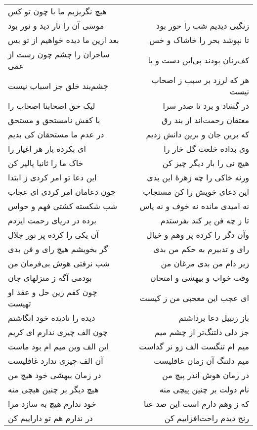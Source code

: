 \begin{center}
\begin{longtable}{l p{0.5cm} r}
هیچ نگریزیم ما با چون تو کس
\\
موسی آن را نار دید و نور بود
&&
زنگیی دیدیم شب را حور بود
\\
بعد ازین ما دیده خواهیم از تو بس
&&
تا نپوشد بحر را خاشاک و خس
\\
ساحران را چشم چون رست از عمی
&&
کف‌زنان بودند بی‌این دست و پا
\\
چشم‌بند خلق جز اسباب نیست
&&
هر که لرزد بر سبب ز اصحاب نیست
\\
لیک حق اصحابنا اصحاب را
&&
در گشاد و برد تا صدر سرا
\\
با کفش نامستحق و مستحق
&&
معتقان رحمت‌اند از بند رق
\\
در عدم ما مستحقان کی بدیم
&&
که برین جان و برین دانش زدیم
\\
ای بکرده یار هر اغیار را
&&
وی بداده خلعت گل خار را
\\
خاک ما را ثانیا پالیز کن
&&
هیچ نی را بار دیگر چیز کن
\\
این دعا تو امر کردی ز ابتدا
&&
ورنه خاکی را چه زهرهٔ این بدی
\\
چون دعامان امر کردی ای عجاب
&&
این دعای خویش را کن مستجاب
\\
شب شکسته کشتی فهم و حواس
&&
نه امیدی مانده نه خوف و نه یاس
\\
برده در دریای رحمت ایزدم
&&
تا ز چه فن پر کند بفرستدم
\\
آن یکی را کرده پر نور جلال
&&
وآن دگر را کرده پر وهم و خیال
\\
گر بخویشم هیچ رای و فن بدی
&&
رای و تدبیرم به حکم من بدی
\\
شب نرفتی هوش بی‌فرمان من
&&
زیر دام من بدی مرغان من
\\
بودمی آگه ز منزلهای جان
&&
وقت خواب و بیهشی و امتحان
\\
چون کفم زین حل و عقد او تهیست
&&
ای عجب این معجبی من ز کیست
\\
دیده را نادیده خود انگاشتم
&&
باز زنبیل دعا برداشتم
\\
چون الف چیزی ندارم ای کریم
&&
جز دلی دلتنگ‌تر از چشم میم
\\
این الف وین میم ام بود ماست
&&
میم ام تنگست الف زو نر گداست
\\
آن الف چیزی ندارد غافلیست
&&
میم دلتنگ آن زمان عاقلیست
\\
در زمان بیهشی خود هیچ من
&&
در زمان هوش اندر پیچ من
\\
هیچ دیگر بر چنین هیچی منه
&&
نام دولت بر چنین پیچی منه
\\
خود ندارم هیچ به سازد مرا
&&
که ز وهم دارم است این صد عنا
\\
در ندارم هم تو داراییم کن
&&
رنج دیدم راحت‌افزاییم کن

\end{longtable}
\end{center}
